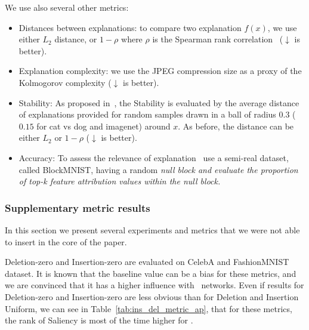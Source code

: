 We use also several other metrics:
\begin{itemize}
    \item Distances between explanations: to compare two explanation $f(x)$, we use either $L_2$ distance, or $1-\rho$ where $\rho$ is the Spearman rank correlation~\cite{Adebayo18Sanity,felHowGood22,tomsett2019sanity} ($\downarrow$ is better).
    \item Explanation complexity: we use the JPEG compression size as a proxy of the Kolmogorov complexity ($\downarrow$ is better).
    \item Stability: As proposed in~\cite{Yeh19InfidelityExplain}, the Stability is evaluated by the average distance of explanations provided for random samples drawn in a ball of radius $0.3$ ($0.15$ for cat vs dog and imagenet) around $x$. As before, the distance can be either $L_2$ or $1-\rho$ ($\downarrow$ is better).
    \item Accuracy: To assess the relevance of explanation~\cite{Harshay2021} use a semi-real dataset, called BlockMNIST, having a random \it{null} block and evaluate the proportion of top-k feature attribution values within the \it{null} block.
\end{itemize}

\subsubsection{Supplementary metric results}
In this section we present several experiments and metrics that we were not able to insert in the core of the paper.

Deletion-zero and Insertion-zero are evaluated on CelebA and FashionMNIST dataset. It is known that the baseline value can be a bias for these metrics, and we are convinced that it has a higher influence with \onlyonelip~networks.
Even if results for Deletion-zero and Insertion-zero are less obvious than for Deletion and Insertion Uniform, we can see in Table~\ref{tab:ins_del_metric_ap}, that for these metrics, the rank of Saliency is most of the time higher for \otnn.

